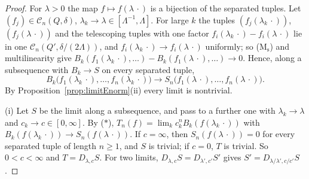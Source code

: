 \documentclass[aps,prd,twocolumn,superscriptaddress,nofootinbib,longbibliography,floatfix,amsmath,amssymb,10pt]{revtex4-2}
\theoremstyle{definition}
\theoremstyle{remark}
\begin{document}
\begin{proof}
For $\lambda>0$ the map $f\mapsto f(\lambda\,\cdot)$ is a bijection of the
separated tuples. Let $(f_j)\in\mathcal C_n(Q,\delta)$, $\lambda_k\to
\lambda\in[\Lambda^{-1},\Lambda]$. For large $k$ the tuples $(f_j(\lambda_k
\,\cdot))$, $(f_j(\lambda\,\cdot))$ and the telescoping tuples with one
factor $f_i(\lambda_k\,\cdot)-f_i(\lambda\,\cdot)$ lie in one $\mathcal C_n(
Q',\delta/(2\Lambda))$, and $f_i(\lambda_k\,\cdot)\to f_i(\lambda\,\cdot)$
uniformly; so (M$_{\mathrm s}$) and multilinearity give $B_k(f_1(\lambda_k
\,\cdot),\dots)-B_k(f_1(\lambda\,\cdot),\dots)\to0$. Hence, along a
subsequence with $B_k\to S$ on every separated tuple,
\[
B_k\bigl(f_1(\lambda_k\,\cdot),\dots,f_n(\lambda_k\,\cdot)\bigr)\to S_n\bigl(
f_1(\lambda\,\cdot),\dots,f_n(\lambda\,\cdot)\bigr) .\tag{$*$}
\]
By Proposition~\ref{prop:limitEnorm}(ii) every limit is nontrivial.

(i) Let $S$ be the limit along a subsequence, and pass to a further one
with $\lambda_k\to\lambda$ and $c_k\to c\in[0,\infty]$. By ($*$), $T_n(f)=
\lim_kc_k^nB_k(f(\lambda_k\,\cdot))$ with $B_k(f(\lambda_k\,\cdot))\to
S_n(f(\lambda\,\cdot))$. If $c=\infty$, then $S_n(f(\lambda\,\cdot))=0$ for
every separated tuple of length $n\ge1$, and $S$ is trivial; if $c=0$, $T$
is trivial. So $0<c<\infty$ and $T=D_{\lambda,c}S$. For two limits,
$D_{\lambda,c}S=D_{\lambda',c'}S'$ gives $S'=D_{\lambda/\lambda',c/c'}S$.


\end{proof}
\end{document}
